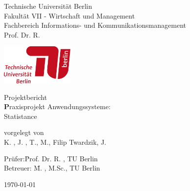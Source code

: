 \begin{titlepage}	
\noindent
\begin{minipage}{0.75\textwidth}
{\small
Technische Universit\"at Berlin\\
Fakult\"at VII - Wirtschaft und Management\\
Fachbereich Informations- und Kommunikationsmanagement\\
Prof. Dr. R.\\
}%
\end{minipage}%
\begin{minipage}{0.25\textwidth}%

{\raggedleft\includegraphics[height=2cm]{content/00_frontpages/TU_Logo_lang_RGB_rot.png}}

\hfill
\end{minipage}%

\vspace{2cm}

\thispagestyle{empty}
\begin{center}

{\large Projektbericht}\\
\vspace{1cm}
{\huge\textbf
Praxisprojekt Anwendungssysteme:\\
Statistance
}
\vspace{1.2cm}

{\large vorgelegt von\\
	 K. , J. , T., M., Filip Twardzik, J.
}\\[2cm]

\begin{minipage}{\linewidth} 
\begin{tabbing}
  		Prüfer:\quad \= Prof. Dr. R. , TU Berlin\\[0.3cm]
    	Betreuer: \quad \= M. , M.Sc., TU Berlin \\
    						         
\end{tabbing}
\end{minipage}

\vspace{1.5cm}
\today
\end{center}
\thispagestyle{empty}
\newpage
\setcounter{page}{1}
\end{titlepage}

\shipout\null
